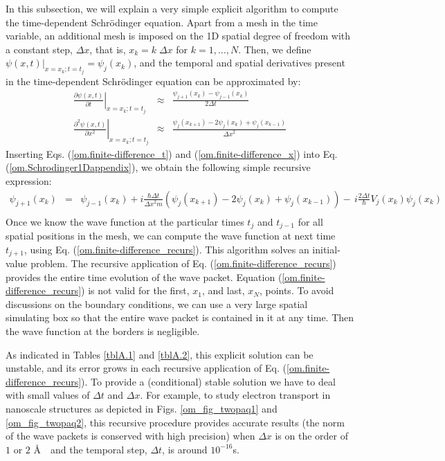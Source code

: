 \documentclass[nofootinbib, secnumarabic, amsmath, nobibnotes,11pt,aps,pra, floatfix]{revtex4-1}
\newcommand{\eref}[1]{Eq. (\ref{#1})}
\newcommand{\Eref}[1]{Equation (\ref{#1})}
\begin{document}
In this subsection, we will explain a very simple explicit algorithm to compute the time-dependent Schr\"odinger equation. Apart from a mesh in the time variable, an additional mesh is imposed on the 1D spatial degree of freedom with a constant step, $\Delta x$, that is, $x_k = k \; \Delta x $ for $k = 1,\ldots,N$. Then, we define $\psi(x,t)|_{x = x_k;t = t_j} = \psi_{j}(x_k)$, and the temporal and spatial derivatives present in the time-dependent Schr\"odinger equation can be approximated by:
\begin{eqnarray}
\left.\frac{\partial \psi \left(x,t \right)}{\partial t}\right|_{x = x_k;t = t_j} &\approx& \frac{\psi_{j + 1}(x_k) - \psi_{j - 1}(x_k)} {2\Delta t} \label{om.finite-difference_t} \\
\left.\frac{{{\partial }^{2}}\psi \left( x,t \right)}{\partial {{x}^{2}}}\right|_{x = x_k;t = t_j} &\approx& \frac{\psi_{j}(x_{k + 1}) - 2\psi_{j}(x_{k}) + \psi_{j}(x_{k - 1})}{{\Delta x}^{2}} \label{om.finite-difference_x}
\end{eqnarray}
Inserting Eqs. (\ref{om.finite-difference_t}) and (\ref{om.finite-difference_x}) into \eref{om.Schrodinger1Dappendix}, we obtain the following simple recursive expression:
\begin{eqnarray}
\psi_{j + 1}(x_{k}) &=& \psi_{j - 1}(x_{k}) + i\frac{\hbar \Delta t}{{{\Delta x}^{2}}m}\left(\psi_{j}(x_{k + 1}) - 2\psi_{j}(x_{k}) + \psi_{j}(x_{k - 1})\right)-\,i\frac{2\Delta t}{\hbar }V_{j}(x_k) \psi_{j}(x_{k})\nonumber\\
\label{om.finite-difference_recurs}
\end{eqnarray}
Once we know the wave function at the particular times $t_j$ and
$t_{j - 1}$ for all spatial positions in the mesh, we can compute
the wave function at next time $t_{j + 1}$, using
\eref{om.finite-difference_recurs}. This algorithm solves an
initial-value problem. The recursive application of
\eref{om.finite-difference_recurs} provides the entire time
evolution of the wave packet. \Eref{om.finite-difference_recurs} is
not valid for the first, $x_1$, and last, $x_N$, points. To avoid
discussions on the boundary conditions, we can use a very large
spatial simulating box so that the entire wave packet is contained
in it at any time. Then the wave function at the borders is
negligible.\enlargethispage{-1pc}

As indicated in Tables \ref{tblA.1} and \ref{tblA.2}, this explicit
solution can be unstable, and its error grows in each recursive
application of \eref{om.finite-difference_recurs}. To provide a
(conditional) stable solution we have to deal with small
values of $\Delta t$ and $\Delta x$. For example, to study electron
transport in nanoscale structures as depicted in
Figs. \ref{om_fig_twopaq1} and \ref{om_fig_twopaq2}, this recursive
procedure provides accurate results (the norm of the wave packets is
conserved with high precision) when $\Delta x$ is on the order of
$1$ or $2$ \AA \  \ and the temporal step, $\Delta t$, is around
$10^{-16}$s.
\end{document}

